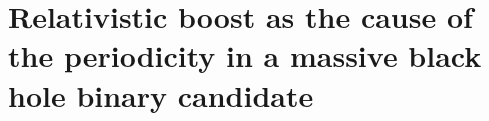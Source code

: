 \chapter[Relativistic boost]{Relativistic boost as the cause of the periodicity in a massive black hole binary candidate}
\label{ch:PG1302_b}







%








% 




